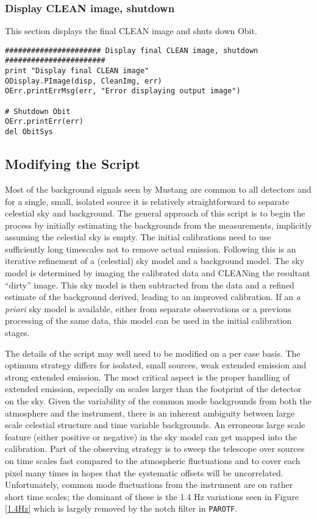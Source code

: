 \documentclass[11pt]{report}
\begin{document}
\subsubsection{Display CLEAN image, shutdown}
This section displays the final CLEAN image and shuts down Obit.
\begin{verbatim}
###################### Display final CLEAN image, shutdown #######################
print "Display final CLEAN image"
ODisplay.PImage(disp, CleanImg, err)
OErr.printErrMsg(err, "Error displaying output image")

# Shutdown Obit
OErr.printErr(err)
del ObitSys
\end{verbatim}

\subsection{Modifying the Script}
Most of the background signals seen by Mustang are common to all
detectors and for a single, small, isolated source it is relatively
straightforward to separate celestial sky and background.
The general approach of this script is to begin the process by
initially estimating the backgrounds from the measurements, implicitly
assuming the celestial sky is empty.
The initial calibrations need to use sufficiently long timescales not to
remove actual emission.
Following this is an iterative refinement of a (celestial) sky model
and a background model.
The sky model is determined by imaging the calibrated data and
CLEANing the resultant ``dirty'' image.
This sky model is then subtracted from the data and a refined
estimate of the background derived, leading to an improved
calibration. 
If an {\it a priori} sky model is available, either from separate
observations or a previous processing of the same data, this model can
be used in the initial calibration stages.

The details of the script may well need to be modified on a per case
basis.
The optimum strategy differs for isolated, small sources, weak
extended emission and strong extended emission.
The most critical aspect is the proper handling of extended emission,
especially on scales larger than the footprint of the detector on the
sky.
Given the variability of the common mode backgrounds from both the
atmosphere and the instrument, there is an inherent ambiguity between
large scale celestial structure and time variable backgrounds.
An erroneous large scale feature (either positive or negative) in the
sky model can get mapped into the calibration.
Part of the observing strategy is to sweep the telescope over sources
on time scales fast compared to the atmospheric fluctuations and to
cover each pixel many times in hopes that the systematic offsets will be
uncorrelated. 
Unfortunately, common mode fluctuations from the instrument are on
rather short time scales; the dominant of these is the 1.4 Hz
variations seen in Figure \ref{1.4Hz} which is largely removed by the
notch filter in {\tt  PAROTF}.
\end{document}
